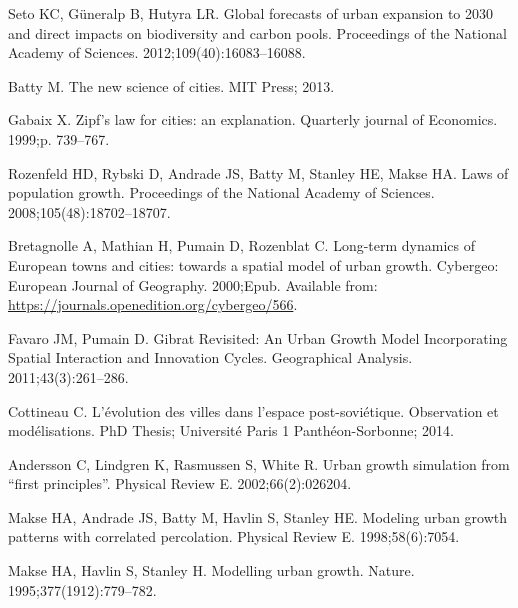 \documentclass[10pt,letterpaper]{article}
\begin{document}
%
%

\begin{thebibliography}{10}

Seto KC, G{\"u}neralp B, Hutyra LR.
\newblock Global forecasts of urban expansion to 2030 and direct impacts on
  biodiversity and carbon pools.
\newblock Proceedings of the National Academy of Sciences.
  2012;109(40):16083--16088.

Batty M.
\newblock The new science of cities.
\newblock MIT Press; 2013.

Gabaix X.
\newblock Zipf's law for cities: an explanation.
\newblock Quarterly journal of Economics. 1999;p. 739--767.

Rozenfeld HD, Rybski D, Andrade JS, Batty M, Stanley HE, Makse HA.
\newblock Laws of population growth.
\newblock Proceedings of the National Academy of Sciences.
  2008;105(48):18702--18707.

Bretagnolle A, Mathian H, Pumain D, Rozenblat C.
\newblock Long-term dynamics of European towns and cities: towards a spatial
  model of urban growth.
\newblock Cybergeo: European Journal of Geography. 2000;Epub.
\newblock Available from: \url{https://journals.openedition.org/cybergeo/566}.

Favaro JM, Pumain D.
\newblock Gibrat Revisited: An Urban Growth Model Incorporating Spatial
  Interaction and Innovation Cycles.
\newblock Geographical Analysis. 2011;43(3):261--286.

Cottineau C.
\newblock L'{\'e}volution des villes dans l'espace post-sovi{\'e}tique.
  Observation et mod{\'e}lisations.
\newblock PhD Thesis; Universit{\'e} Paris 1 Panth{\'e}on-Sorbonne; 2014.

Andersson C, Lindgren K, Rasmussen S, White R.
\newblock Urban growth simulation from ``first principles''.
\newblock Physical Review E. 2002;66(2):026204.

Makse HA, Andrade JS, Batty M, Havlin S, Stanley HE.
\newblock Modeling urban growth patterns with correlated percolation.
\newblock Physical Review E. 1998;58(6):7054.

Makse HA, Havlin S, Stanley H.
\newblock Modelling urban growth.
\newblock Nature. 1995;377(1912):779--782.


\end{thebibliography}
\end{document}
